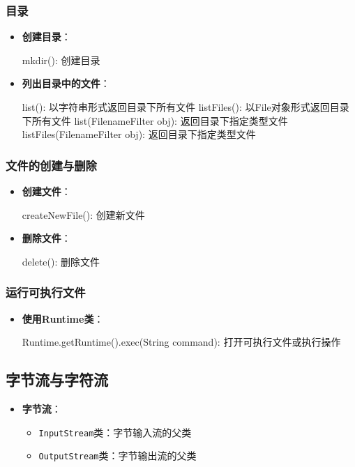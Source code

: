 \documentclass[a4paper, 10pt]{ctexart}
\begin{document}
\subsubsection{目录}
\begin{itemize}
  \item \textbf{创建目录}：
  \begin{codeblock}
mkdir(): 创建目录
  \end{codeblock}
  \item \textbf{列出目录中的文件}：
  \begin{codeblock}
list(): 以字符串形式返回目录下所有文件
listFiles(): 以File对象形式返回目录下所有文件
list(FilenameFilter obj): 返回目录下指定类型文件
listFiles(FilenameFilter obj): 返回目录下指定类型文件
  \end{codeblock}
\end{itemize}

\subsubsection{文件的创建与删除}
\begin{itemize}
  \item \textbf{创建文件}：
  \begin{codeblock}
createNewFile(): 创建新文件
  \end{codeblock}
  \item \textbf{删除文件}：
  \begin{codeblock}
delete(): 删除文件
  \end{codeblock}
\end{itemize}

\subsubsection{运行可执行文件}
\begin{itemize}
  \item \textbf{使用Runtime类}：
  \begin{codeblock}
Runtime.getRuntime().exec(String command): 打开可执行文件或执行操作
  \end{codeblock}
\end{itemize}

\subsection{字节流与字符流}
\begin{itemize}
  \item \textbf{字节流}：
  \begin{itemize}
    \item \texttt{InputStream}类：字节输入流的父类
    \item \texttt{OutputStream}类：字节输出流的父类
  \end{itemize}
\end{itemize}
\end{document}
